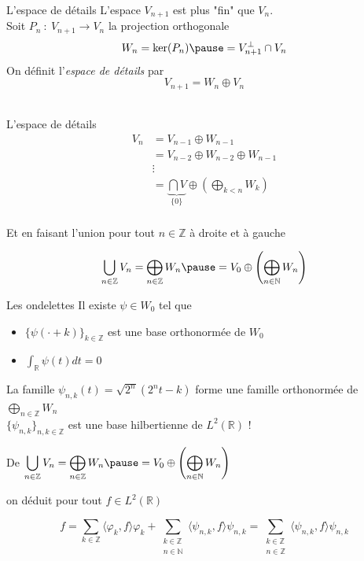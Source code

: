 \documentclass[french]{beamer}
\begin{document}
\begin{frame}{L'espace de détails}
	L'espace $V_{n+1}$ est plus "fin" que $V_n$.\\
	\pause
	Soit $P_n ~ : ~ V_{n+1} \rightarrow V_n$ la projection orthogonale \pause $$W_n = \ker (P_n) \pause = V_{n+1}^\bot \cap V_n$$
	\pause
	On définit l'\textit{espace de détails} par
	$$V_{n+1} = W_n \oplus V_n$$\\
\end{frame}

\begin{frame}{L'espace de détails}
	\begin{align*}
		V_n &= V_{n-1} \oplus W_{n-1} \\
		&= V_{n-2} \oplus W_{n-2} \oplus W_{n-1} \\
		&\vdots \\
		&= \underbrace{\bigcap V}_{\{0\}} \oplus \left(\bigoplus_{k < n} W_k\right) \\
	\end{align*}

	\pause
	Et en faisant l'union pour tout $n \in \mathbb{Z}$ à droite et à gauche

	\pause
	$$\bigcup_{n \in \mathbb{Z}} V_n = \bigoplus_{n \in \mathbb{Z}} W_n \pause = V_0 \oplus \left(\bigoplus_{n \in \mathbb{N}} W_n\right)$$
\end{frame}

\begin{frame}{Les ondelettes}
	Il existe $\psi \in W_0$ tel que \\
	\pause
	\begin{itemize}
		\item $\{\psi(\cdot + k)\}_{k \in \mathbb{Z}}$ est une base orthonormée de $W_0$
		\pause
		\item $\displaystyle \int_{\mathbb{R}} \psi(t) dt = 0$ \\
	\end{itemize}
	\pause	
	
	La famille $\psi_{n, k}(t) = \sqrt{2^n}(2^n t - k)$ forme une famille orthonormée de $\displaystyle \bigoplus_{n \in \mathbb{Z}} W_n$\\
	\pause
	$\{\psi_{n, k}\}_{n, k \in \mathbb{Z}}$ est une base hilbertienne de $L^2(\mathbb{R})$ !
\end{frame}

\begin{frame}
	De $\displaystyle \bigcup_{n \in \mathbb{Z}} V_n = \bigoplus_{n \in \mathbb{Z}} W_n \pause = V_0 \oplus \left(\bigoplus_{n \in \mathbb{N}} W_n\right)$

	on déduit pour tout $f \in L^2(\mathbb{R})$
	
	$$f = \sum_{k \in \mathbb{Z}} \langle \varphi_k, f \rangle \varphi_k + \sum_{\substack{k \in \mathbb{Z} \\ n \in \mathbb{N}}} \langle \psi_{n, k}, f \rangle \psi_{n, k} = \sum_{\substack{k \in \mathbb{Z} \\ n \in \mathbb{Z}}} \langle \psi_{n, k}, f \rangle \psi_{n, k}$$
\end{frame}
\end{document}
